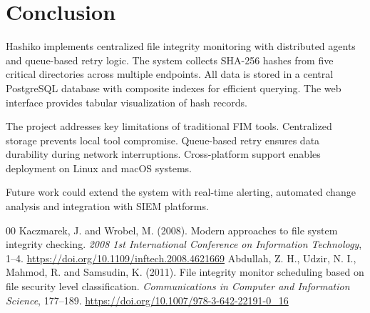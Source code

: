 \documentclass[conference]{IEEEtran}
\begin{document}
\section{Conclusion}

Hashiko implements centralized file integrity monitoring with distributed agents and queue-based retry logic. The system collects SHA-256 hashes from five critical directories across multiple endpoints. All data is stored in a central PostgreSQL database with composite indexes for efficient querying. The web interface provides tabular visualization of hash records.

The project addresses key limitations of traditional FIM tools. Centralized storage prevents local tool compromise. Queue-based retry ensures data durability during network interruptions. Cross-platform support enables deployment on Linux and macOS systems.

Future work could extend the system with real-time alerting, automated change analysis and integration with SIEM platforms.

\begin{thebibliography}{00}
     Kaczmarek, J. and Wrobel, M. (2008). Modern approaches to file system integrity checking. \textit{2008 1st International Conference on Information Technology}, 1--4. \url{https://doi.org/10.1109/inftech.2008.4621669}
     Abdullah, Z. H., Udzir, N. I., Mahmod, R. and Samsudin, K. (2011). File integrity monitor scheduling based on file security level classification. \textit{Communications in Computer and Information Science}, 177--189. \url{https://doi.org/10.1007/978-3-642-22191-0_16}
\end{thebibliography}
\end{document}
